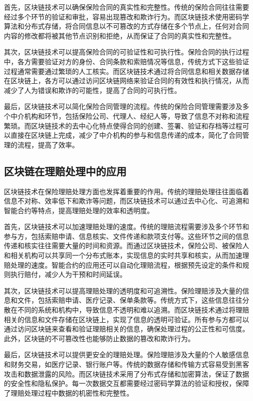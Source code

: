 \documentclass[a4paper,12pt]{ctexart}
\begin{document}
首先，区块链技术可以确保保险合同的真实性和完整性。传统的保险合同往往需要经过多个环节的验证和审批，容易出现篡改和欺诈行为。而区块链技术使用密码学算法和分布式存储，将合同信息以不可篡改的方式存储在多个节点上，任何对合同内容的修改都将被其他节点识别和拒绝，从而保证了合同的真实性和完整性。

其次，区块链技术可以提高保险合同的可验证性和可执行性。保险合同的执行过程中，各方需要验证对方的身份、合同条款和索赔情况等信息，传统方式下这些验证过程通常需要通过繁琐的人工核实。而区块链技术通过将合同信息和相关数据存储在区块链上，各方可以通过访问区块链网络来验证合同的有效性和执行情况，从而减少了人为错误和欺诈的可能性，提高了合同的可执行性。

最后，区块链技术可以简化保险合同管理的流程。传统的保险合同管理需要涉及多个中介机构和环节，包括保险公司、代理人、经纪人等，导致了信息不对称和流程繁琐。而区块链技术的去中心化特点使得合同的创建、签署、验证和存档等过程可以直接在区块链上完成，减少了中介机构的参与和信息传递的成本，简化了合同管理的流程，提高了效率。
\subsection{区块链在理赔处理中的应用}
区块链技术在保险理赔处理方面也发挥着重要的作用。传统的理赔处理往往面临着信息不对称、效率低下和欺诈等问题，而区块链技术可以通过去中心化、可追溯和智能合约等特点，提高理赔处理的效率和透明度。

首先，区块链技术可以加速理赔处理的速度。传统的理赔流程需要涉及多个环节和参与方，包括索赔申请、信息核实、文件传递和款项支付等。这些环节之间的信息传递和核实往往需要大量的时间和资源。而通过区块链技术，保险公司、被保险人和相关机构可以共享同一个分布式账本，实现信息的实时共享和核实，从而加速理赔处理的速度。智能合约的应用还可以自动化理赔流程，根据预先设定的条件和规则执行赔付，减少人为干预和时间延误。

其次，区块链技术可以提高理赔处理的透明度和可追溯性。保险理赔涉及大量的信息和文件，包括索赔申请、医疗记录、保单条款等。传统方式下，这些信息往往分散在不同的系统和机构中，导致信息不透明和难以追溯。而区块链技术通过将理赔相关的信息和文件存储在区块链上，实现了信息的透明可验证。所有参与方都可以通过访问区块链来查看和验证理赔相关的信息，确保处理过程的公正性和可信度。此外，区块链的不可篡改性也能够防止数据的篡改和欺诈行为。

最后，区块链技术可以提供更安全的理赔处理。保险理赔涉及大量的个人敏感信息和财务交易，如医疗记录、银行账户等。传统的数据存储和传输方式容易受到黑客攻击和数据泄露的风险。而区块链技术采用了分布式存储和加密算法，保证了数据的安全性和隐私保护。每一次数据交互都需要经过密码学算法的验证和授权，保障了理赔处理过程中数据的机密性和完整性。
\end{document}
